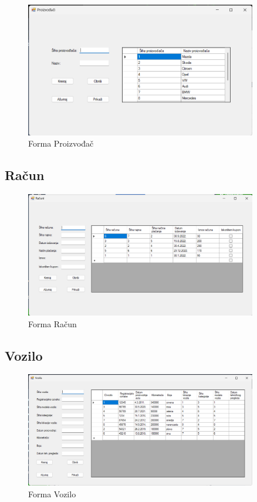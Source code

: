 \documentclass[]{foi} %
\begin{document}
\begin{figure}[!ht]
    \centering
    \includegraphics[width=0.9\textwidth]{slike/proizvodac.png}
    \caption{Forma Proizvođač}
    \label{fig:proizvodac}
\end{figure}
\newpage

\subsection{Račun}

\begin{figure}[!ht]
    \centering
    \includegraphics[width=0.9\textwidth]{slike/racun.png}
    \caption{Forma Račun}
    \label{fig:racun}
\end{figure}

\subsection{Vozilo}

\begin{figure}[!ht]
    \centering
    \includegraphics[width=0.9\textwidth]{slike/vozilo.png}
    \caption{Forma Vozilo}
    \label{fig:vozilo}
\end{figure}
\end{document}
